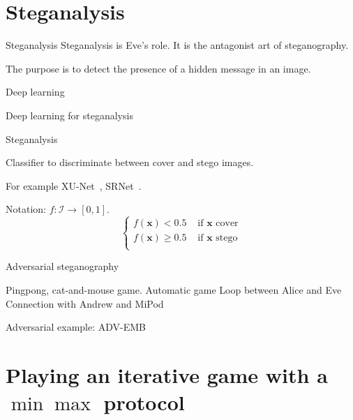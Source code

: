 \documentclass[10pt]{beamer}
\begin{document}
\section{Steganalysis}


\begin{frame}{Steganalysis}
Steganalysis is Eve's role. It is the antagonist art of steganography. 

\alert{The purpose is to detect the presence of a hidden message in an image.}

\end{frame}

\begin{frame}{Deep learning}
\end{frame}


\begin{frame}{Deep learning for steganalysis}
\end{frame}


\begin{frame}{Steganalysis}

Classifier to discriminate between cover and stego images. 


\pause
For example XU-Net~\cite{xu2017deep}, SRNet~\cite{boroumand2018deep}.

Notation: $f : \mathcal{I} \rightarrow [0,1]$.
\begin{equation*}
    \left\{
    \begin{array}{ll}
    f(\mathbf{x}) < 0.5 & \mbox{ if } \mathbf{x}\mbox{ cover} \\
    f(\mathbf{x}) \geq 0.5 & \mbox{ if } \mathbf{x}\mbox{ stego} \\
    \end{array}
    \right.
\end{equation*}
\end{frame}


\begin{frame}{Adversarial steganography}

Pingpong, cat-and-mouse game.
Automatic game
Loop between Alice and Eve
Connection with Andrew and MiPod

Adversarial example: ADV-EMB
\minmax
    
\end{frame}

\section{Playing an iterative game with a $\min\max$ protocol}
\end{document}
